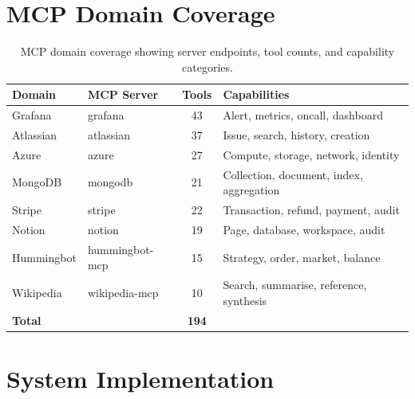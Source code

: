 \documentclass[10pt,a4paper,twocolumn]{article}
\begin{document}



\clearpage
\onecolumn
\appendix
\section{MCP Domain Coverage}
\label{app:domains}

\begin{table}[H]
\centering
\caption{MCP domain coverage showing server endpoints, tool counts, and capability categories.}
\label{tab:domain_coverage}
\scriptsize
\setlength{\tabcolsep}{3pt}
\begin{tabular}{@{}llcl@{}}
\toprule
\textbf{Domain} & \textbf{MCP Server} & \textbf{Tools} & \textbf{Capabilities} \\
\midrule
Grafana & grafana & 43 & Alert, metrics, oncall, dashboard \\
Atlassian & atlassian & 37 & Issue, search, history, creation \\
Azure & azure & 27 & Compute, storage, network, identity \\
MongoDB & mongodb & 21 & Collection, document, index, aggregation \\
Stripe & stripe & 22 & Transaction, refund, payment, audit \\
Notion & notion & 19 & Page, database, workspace, audit \\
Hummingbot & hummingbot-mcp & 15 & Strategy, order, market, balance \\
Wikipedia & wikipedia-mcp & 10 & Search, summarise, reference, synthesis \\
\midrule
\textbf{Total} & & \textbf{194} & \\
\bottomrule
\end{tabular}
\end{table}

\clearpage
\section{System Implementation}
\label{app:implementation}
\end{document}
